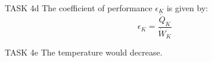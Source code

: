 TASK 4d  
The coefficient of performance \( \epsilon_K \) is given by:  
\[
\epsilon_K = \frac{\dot{Q}_K}{\dot{W}_K}
\]

TASK 4e  
The temperature would decrease.